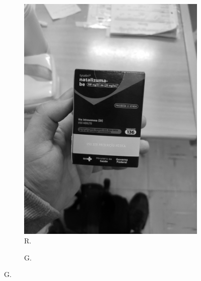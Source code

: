 \begin{figure}[htb]
\begin{subfigure}[t]{0.21\textwidth}
    \end{subfigure}
    \hfill
    \begin{subfigure}[t]{0.21\textwidth}
        \centering
        \caption{R.}
        \label{fig:foto:versoes:1:R}
        \includegraphics[width=\linewidth]{../pictures/tysabri_rgb_r_only.jpg}
    \end{subfigure}
    \hfill
    \begin{subfigure}[t]{0.21\textwidth}
        \centering
        \caption{G.}
        \label{fig:foto:versoes:1:G}

\end{subfigure}
\end{figure}
